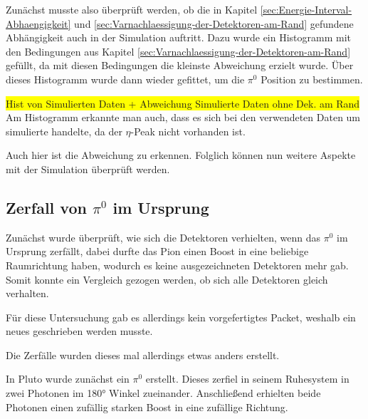 \documentclass[a4paper,11pt,oneside,final,german,openbib,pdftex]{scrbook}
\begin{document}
{Zun\"achst musste also \"uberpr\"uft werden, ob die in Kapitel \ref{sec:Energie-Interval-Abhaengigkeit} und \ref{sec:Varnachlaessigung-der-Detektoren-am-Rand} gefundene Abh\"angigkeit auch in der Simulation auftritt. 
Dazu wurde ein Histogramm mit den Bedingungen aus Kapitel \ref{sec:Varnachlaessigung-der-Detektoren-am-Rand} gef\"ullt, da mit diesen Bedingungen die kleinste Abweichung erzielt wurde. \"Uber dieses Histogramm wurde dann wieder gefittet, um die $\pi^0$ Position zu bestimmen.


\colorbox{yellow}{Hist von Simulierten Daten + Abweichung Simulierte Daten ohne Dek. am Rand}
Am Histogramm erkannte man auch, dass es sich bei den verwendeten Daten um simulierte handelte, da der $\eta$-Peak nicht vorhanden ist. 

Auch hier ist die Abweichung zu erkennen. Folglich k\"onnen nun weitere Aspekte mit der Simulation \"uberpr\"uft werden.

\subsection{Zerfall von $\pi^0$ im Ursprung}

Zun\"achst wurde \"uberpr\"uft, wie sich die Detektoren verhielten, wenn das $\pi^0$ im Ursprung zerf\"allt, dabei durfte das Pion einen Boost in eine beliebige Raumrichtung haben, wodurch es keine ausgezeichneten Detektoren mehr gab. Somit konnte ein Vergleich gezogen werden, ob sich alle Detektoren gleich verhalten. 

F\"ur diese Untersuchung gab es allerdings kein vorgefertigtes Packet, weshalb ein neues geschrieben werden musste. 

Die Zerf\"alle wurden dieses mal allerdings etwas anders erstellt.

In Pluto wurde zun\"achst ein $\pi^0$ erstellt. Dieses zerfiel in seinem Ruhesystem in zwei Photonen im 180° Winkel zueinander. Anschlie{\ss}end erhielten beide Photonen einen zuf\"allig starken Boost in eine zuf\"allige Richtung.

}
\end{document}
